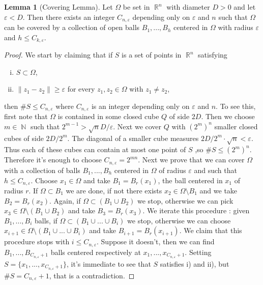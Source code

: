 \documentclass[12pt]{article}
\theoremstyle{definition}
\newtheorem{lemma}{Lemma}
\DeclareMathOperator\rr{\mathbb{R}}
\DeclareMathOperator\nn{\mathbb{N}}
\begin{document}
\begin{lemma}[Covering Lemma]\label{covering}
Let $\Omega$ be set in $\rr^n$ with diameter $D>0$ and let $\varepsilon < D$. Then there exists an integer $C_{n,\varepsilon}$ depending only on $\varepsilon$ and $n$ such that $\Omega$ can be covered by a collection of open balls $B_1,...,B_h$ centered in $\Omega$ with radius $\varepsilon$ and $h \le C_{k,\varepsilon}.$
\end{lemma}
\begin{proof}
We start by claiming that if $S$ is a set of points in $\rr^n$ satisfying
\begin{enumerate}[i)]
\item  	$S \subset \Omega$,
\item $\|z_1-z_2 \|\ge \varepsilon$ for every $z_1,z_2 \in \Omega$ with $z_1 \neq z_2$,
\end{enumerate}
then $\#S\le C_{n,\varepsilon}$ where $C_{n,\varepsilon}$ is an integer depending only on $\varepsilon$ and $n$. To see this, first note that $\Omega$ is contained in some closed cube $Q$ of side $2D$. Then we choose $m \in \nn$ such that $2^{m-1}>\sqrt n D/\varepsilon$. Next we cover $Q$ with $(2^m)^n$ smaller closed cubes of side $2D/2^m$. The diagonal of a smaller cube measures $2D/2^m \cdot \sqrt n <\varepsilon$. Thus each of these cubes can contain at most one point of $S$ ,so $\#S\le (2^m)^n.$ Therefore it's enough to choose $C_{n,\varepsilon}=2^{mn}.$ Next we prove that we can cover $\Omega$ with a collection of balls $B_1,...,B_h$ centered in $\Omega$ of radius $\varepsilon$ and such that $h\le C_{n,\varepsilon}.$ Choose $x_1 \in \Omega$ and take $B_1=B_r(x_1)$, the ball centered in $x_1$ of radius $r$. If $\Omega \subset B_1$ we are done, if not there exists $x_2 \in \Omega\setminus B_1$ and we take $B_2=B_r(x_2).$ Again, if $\Omega \subset (B_1\cup B_2)$ we stop, otherwise we can pick $x_3 \in  \Omega\setminus (B_1 \cup B_2)$ and take $B_3=B_r(x_3).$ We iterate this procedure : given $B_1,...,B_i$ balls, if $ \Omega \subset (B_1\cup...\cup B_i)$ we stop, otherwise we can choose $x_{i+1} \in  \Omega \setminus (B_1\cup...\cup B_i)$ and take $B_{i+1}=B_r(x_{i+1}).$ We claim that this procedure stops with $i\le C_{n,\varepsilon}.$ Suppose it doesn't, then we can find $B_1,...,B_{C_{n,\varepsilon}+1}$ balls centered respectively at $x_1,...,x_{C_{n,\varepsilon}+1}$. Setting $S= \{x_1,...,x_{C_{n,\varepsilon}+1} \}$, it's immediate to see that $S$ satisfies i) and ii), but $\#S=C_{n,\varepsilon}+1$, that is a contradiction.
\end{proof}
\end{document}
